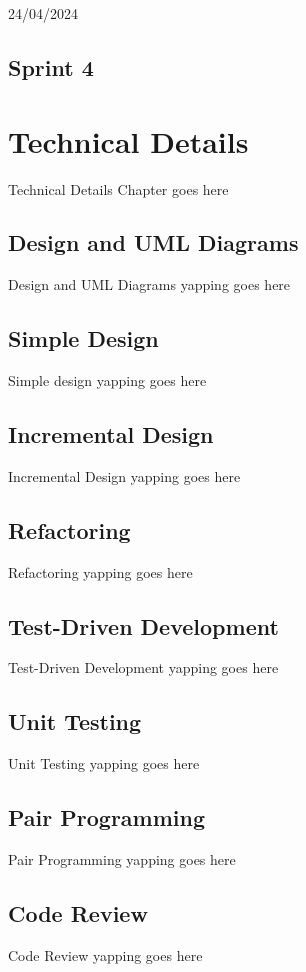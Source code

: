 \documentclass[12pt]{report}
\begin{document}
\hfill 24/04/2024


\section{Sprint 4}


\chapter{Technical Details}
Technical Details Chapter goes here

\section{Design and UML Diagrams}
Design and UML Diagrams yapping goes here

\section{Simple Design}
Simple design yapping goes here

\section{Incremental Design}
Incremental Design yapping goes here

\section{Refactoring}
Refactoring yapping goes here

\section{Test-Driven Development}
Test-Driven Development yapping goes here

\section{Unit Testing}
Unit Testing yapping goes here

\section{Pair Programming}
Pair Programming yapping goes here

\section{Code Review}
Code Review yapping goes here
\end{document}
